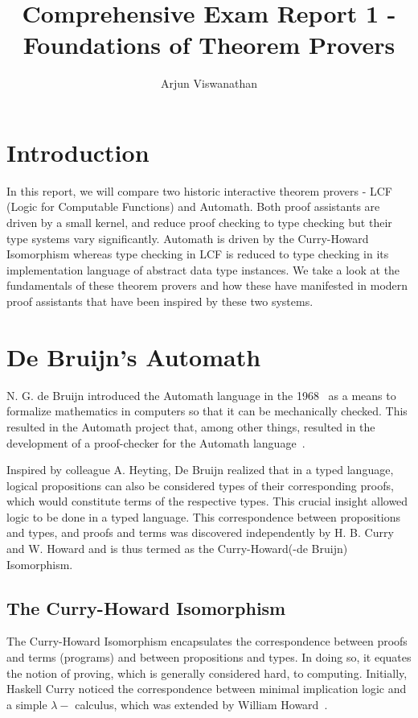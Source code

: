 \documentclass{article}
\begin{document}
\title{Comprehensive Exam Report 1 - Foundations of Theorem Provers}
\author{Arjun Viswanathan}
\date{}
\maketitle

\section{Introduction}
\label{sec:intro}
	In this report, we will compare two historic 
	interactive theorem provers - LCF (Logic for 
	Computable Functions) and Automath. Both proof 
	assistants are driven by a small kernel, and 
	reduce proof checking to type checking but 
	their type systems vary significantly. 
	Automath is driven by the Curry-Howard 
	Isomorphism whereas type checking in LCF 
	is reduced to type checking in its 
	implementation language of abstract data 
	type instances. We take a look at the 
	fundamentals of these theorem provers and how 
	these have manifested in modern proof 
	assistants that have been inspired by these 
	two systems.

\section{De Bruijn's Automath}
\label{sec:automath}
	N. G. de Bruijn introduced the Automath 
	language in the 
	1968~\cite{deBruijn1983, 10.1007/BFb0060623} 
	as a means to formalize mathematics in 
	computers so that it can be mechanically
	checked. This resulted in the Automath 
	project that, among other things, resulted
	in the development of a proof-checker 
	for the Automath language~\cite{5df50ef4ddff4ff091125a511f563319, 
	c398556a074e49a193d5035ae32aaa79}.

	Inspired by colleague A. Heyting, De Bruijn 
	realized that in a typed language, logical 
	propositions can also be considered types 
	of their corresponding proofs, which would 
	constitute terms of the respective types.
	This crucial insight allowed logic to be 
	done in a typed language. This 
	correspondence between propositions 
	and types, and proofs and terms was 
	discovered independently by H. B. Curry 
	and W. Howard and is thus termed as 
	the Curry-Howard(-de Bruijn) Isomorphism.
	
	\subsection{The Curry-Howard Isomorphism}
	\label{sec:curry}
	The Curry-Howard Isomorphism encapsulates 
	the correspondence between proofs and 
	terms (programs) and between propositions
	and types. In doing so, it equates the 
	notion of proving, which is generally 
	considered hard, to computing.
	Initially, Haskell Curry noticed the 
	correspondence between minimal 
	implication logic and a simple 
	$\lambda-$ calculus, which was extended
	by William 
	Howard~\cite{Howard1995-HOWTFN}.
	
\end{document}

